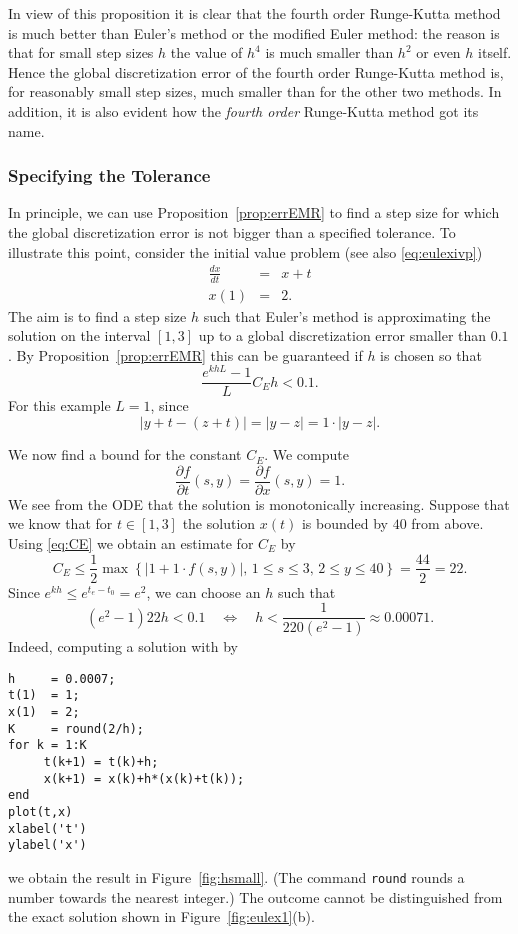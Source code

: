 \documentclass{ximera}
\begin{document}
In view of this proposition it is clear that the fourth order Runge-Kutta 
method is much better than Euler's method or the modified
Euler method: the reason is that for small step sizes $h$ the value of 
$h^4$ is much smaller than $h^2$ or even $h$ itself.  Hence the
global discretization error of the fourth order Runge-Kutta method is,
for reasonably small step sizes, much smaller than for the other two
methods.  In addition, it is also evident how the {\em fourth order\/} 
Runge-Kutta method got its name.

\subsubsection*{Specifying the Tolerance}

In principle, we can use Proposition~\ref{prop:errEMR} to find a step 
size for which the global discretization error is not bigger than a
specified tolerance.  To illustrate this point,  
consider the initial value problem (see also \eqref{eq:eulexivp})
\begin{eqnarray*}
\frac{dx}{dt} & = & x+t \\
x(1) & = & 2.
\end{eqnarray*}
The aim is to find a step size $h$ such that Euler's method is
approximating the solution on the interval $[1,3]$ up to a global 
discretization error smaller than $0.1$.  By Proposition~\ref{prop:errEMR}
this can be guaranteed if $h$ is chosen so that
\[
\frac{e^{khL}-1}{L}C_E h < 0.1.
\]
For this example $L=1$, since
\[
|y+t-(z+t)|=|y-z|=1\cdot |y-z|.
\]

We now find a bound for the constant $C_E$.  We compute
\[
\frac{\partial f}{\partial t}(s,y)=\frac{\partial f}{\partial x}(s,y)=1.
\]
We see from the ODE that the solution is monotonically increasing.
Suppose that we know that for $t\in [1,3]$ the solution $x(t)$ is bounded
by $40$ from above.  Using \eqref{eq:CE} we obtain an estimate for $C_E$ by
\[
C_E\le \frac{1}{2}\max\left\{\vert 1+1\cdot f(s,y)\vert,\, 1\le s\le 3,\,
2 \le y \le 40 \right\}=\frac{44}{2}=22.
\]
Since $e^{kh}\le e^{t_e-t_0}=e^2$, we can choose an $h$ such that
\[
(e^2-1)22h < 0.1\quad \Longleftrightarrow 
\quad h<\frac{1}{220(e^2-1)}\approx 0.00071.
\]
Indeed, computing a solution with \Matlab by
\begin{verbatim}
h     = 0.0007;
t(1)  = 1;
x(1)  = 2;
K     = round(2/h);
for k = 1:K
     t(k+1) = t(k)+h;
     x(k+1) = x(k)+h*(x(k)+t(k));
end
plot(t,x)
xlabel('t')
ylabel('x')
\end{verbatim}
we obtain the result in Figure~\ref{fig:hsmall}.  (The \Matlab
command {\tt round} rounds a number towards the nearest integer.)
The outcome cannot be distinguished from the exact solution shown 
in Figure~\ref{fig:eulex1}(b).
\end{document}
